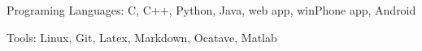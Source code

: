
\begin{description}
\item Programing Languages: 
    C, C++, Python, Java, web app, winPhone app, Android
\item Tools: 
    Linux, Git, Latex, Markdown, Ocatave, Matlab  
\end{description}
